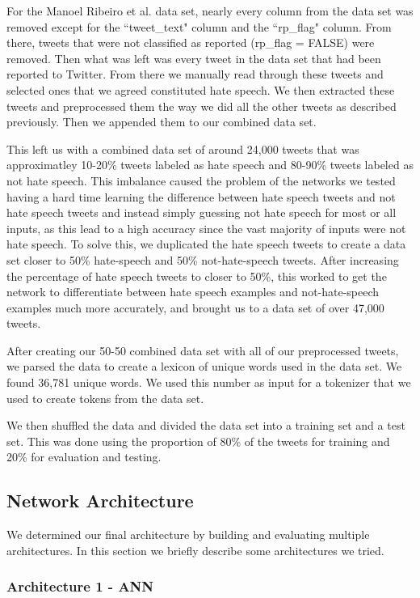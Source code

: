 \documentclass[conference]{sig-alternate-05-2015}
\begin{document}
For the Manoel Ribeiro et al. data set, nearly every column from the data set was removed except for the ``tweet\_text" column and the ``rp\_flag" column. From there, tweets that were not classified as reported (rp\_flag = FALSE) were removed. Then what was left was every tweet in the data set that had been reported to Twitter. From there we manually read through these tweets and selected ones that we agreed constituted hate speech. We then extracted these tweets and preprocessed them the way we did all the other tweets as described previously. Then we appended them to our combined data set.


This left us with a combined data set of around 24,000 tweets that was approximatley 10-20\% tweets labeled as hate speech and 80-90\% tweets labeled as not hate speech. This imbalance caused the problem of the networks we tested having a hard time learning the difference between hate speech tweets and not hate speech tweets and instead simply guessing not hate speech for most or all inputs, as this lead to a high accuracy since the vast majority of inputs were not hate speech. To solve this, we duplicated the hate speech tweets to create a data set closer to 50\% hate-speech and 50\% not-hate-speech tweets. After increasing the percentage of hate speech tweets to closer to 50\%, this worked to get the network to differentiate between hate speech examples and not-hate-speech examples much more accurately, and brought us to a data set of over 47,000 tweets.



After creating our 50-50 combined data set with all of our preprocessed tweets, we parsed the data to create a lexicon of unique words used in the data set. We found 36,781 unique words. We used this number as input for a tokenizer that we used to create tokens from the data set.

We then shuffled the data and divided the data set into a training set and a test set. This was done using the proportion of 80\% of the tweets for training and 20\% for evaluation and testing.

\subsection{Network Architecture}
We determined our final architecture by building and evaluating multiple architectures. In this section we briefly describe some architectures we tried.
\subsubsection{Architecture 1 - ANN}
\end{document}
